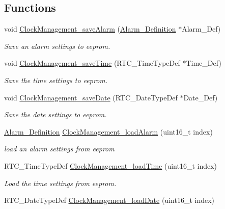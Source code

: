 \subsection*{Functions}
\begin{DoxyCompactItemize}
\item 
void \hyperlink{group___clock___management_ga693a2219ceebdab80e91367b040c751c}{Clock\+Management\+\_\+save\+Alarm} (\hyperlink{struct_alarm___definition}{Alarm\+\_\+\+Definition} $\ast$Alarm\+\_\+\+Def)
\begin{DoxyCompactList}\small\item\em Save an alarm settings to eeprom. \end{DoxyCompactList}\item 
void \hyperlink{group___clock___management_ga009f76700625563bf41ca2c7beceff72}{Clock\+Management\+\_\+save\+Time} (R\+T\+C\+\_\+\+Time\+Type\+Def $\ast$Time\+\_\+\+Def)
\begin{DoxyCompactList}\small\item\em Save the time settings to eeprom. \end{DoxyCompactList}\item 
void \hyperlink{group___clock___management_gaeb0fe7501d61ae2b3c76bff6813b3f92}{Clock\+Management\+\_\+save\+Date} (R\+T\+C\+\_\+\+Date\+Type\+Def $\ast$Date\+\_\+\+Def)
\begin{DoxyCompactList}\small\item\em Save the date settings to eeprom. \end{DoxyCompactList}\item 
\hyperlink{struct_alarm___definition}{Alarm\+\_\+\+Definition} \hyperlink{group___clock___management_gab8401f24d519d3a2e54c3ba5dab80376}{Clock\+Management\+\_\+load\+Alarm} (uint16\+\_\+t index)
\begin{DoxyCompactList}\small\item\em load an alarm settings from eeprom \end{DoxyCompactList}\item 
R\+T\+C\+\_\+\+Time\+Type\+Def \hyperlink{group___clock___management_gab71fe17a64f012980cc619f7d3d55887}{Clock\+Management\+\_\+load\+Time} (uint16\+\_\+t index)
\begin{DoxyCompactList}\small\item\em Load the time settings from eeprom. \end{DoxyCompactList}\item 
R\+T\+C\+\_\+\+Date\+Type\+Def \hyperlink{group___clock___management_ga7bc7fe03cb9b82c9d7bc38ece99b7eb1}{Clock\+Management\+\_\+load\+Date} (uint16\+\_\+t index)

\end{DoxyCompactItemize}
